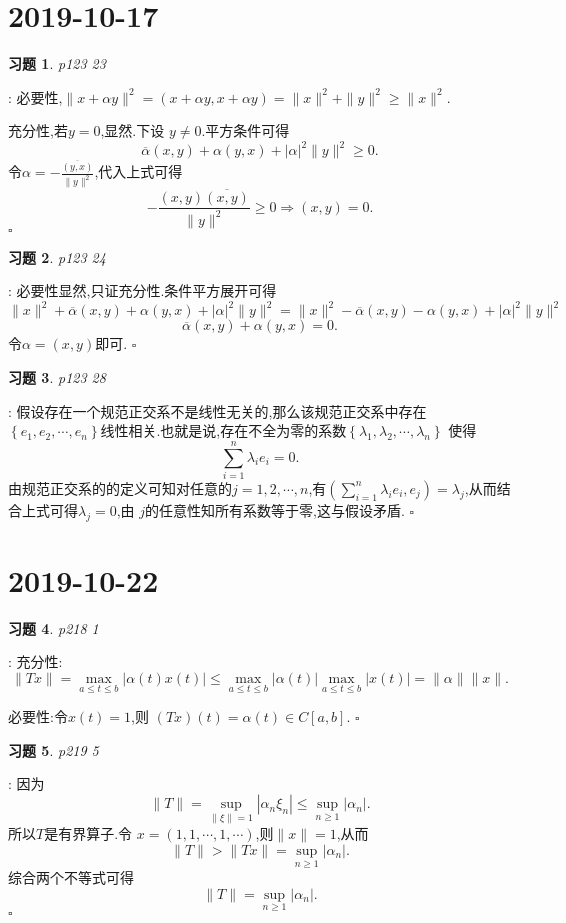\documentclass[a4paper]{article}
\newtheorem*{exe}{习题}
\newenvironment{sol}{{\noindent\bfseries 解}:}{\hfill $\square$\par}
\begin{document}
\section{2019-10-17}
\begin{exe}
  p123 23
\end{exe}
\begin{sol}
  必要性,$\|x+\alpha y\|^2=(x+\alpha y,x+\alpha y)=\|x\|^2+\|y\|^2\ge \|x\|^2$.
  
  充分性,若$y=0$,显然.下设 $y\neq 0$.平方条件可得
   \[
     \overline{\alpha}(x,y)+\alpha(y,x)+\left| \alpha \right| ^2\|y\|^2\ge 0
   .\] 
   令$\alpha=-\frac{\overline{(y,x)}}{\|y\|^2}$,代入上式可得
   \[
     -\frac{(x,y)\overline{(x,y)}}{\|y\|^2}\ge 0\Rightarrow (x,y)=0
   .\] 
\end{sol}
\begin{exe}
  p123 24
\end{exe}
\begin{sol}
  必要性显然,只证充分性.条件平方展开可得
  \[
    \|x\|^2+\overline{\alpha}(x,y)+\alpha(y,x)+\left| \alpha \right| ^2\|y\|^2=\|x\|^2-\overline{\alpha}(x,y)-\alpha(y,x)+\left| \alpha \right| ^2\|y\|^2
  \] 
  \[
    \overline{\alpha}(x,y)+\alpha(y,x)=0
  .\] 
  令$\alpha=(x,y)$即可.
\end{sol}
\begin{exe}
  p123 28
\end{exe}
\begin{sol}
  假设存在一个规范正交系不是线性无关的,那么该规范正交系中存在$\left\{ e_1,e_2,\cdots,e_n \right\} $线性相关.也就是说,存在不全为零的系数$\left\{ \lambda_1,\lambda_2,\cdots,\lambda_n \right\} $ 使得
  \[
  \sum_{i=1}^{n} \lambda_ie_i=0
  .\] 
  由规范正交系的的定义可知对任意的$j=1,2,\cdots,n$,有$(\sum_{i=1}^{n} \lambda_ie_i,e_j)=\lambda_j$,从而结合上式可得$\lambda_j=0$,由 $j$的任意性知所有系数等于零,这与假设矛盾.
\end{sol}
\section{2019-10-22}
\begin{exe}
  p218 1
\end{exe}
\begin{sol}
  充分性:
  \[
    \|Tx\|=\max_{a\le t\le b}\left| \alpha(t)x(t) \right| \le \max_{a\le t\le b}\left| \alpha(t) \right| \max_{a\le t\le b}\left| x(t) \right| = \|\alpha\|\|x\|
  .\]

  必要性:令$x(t)=1$,则 $(Tx)(t)=\alpha(t)\in C[a,b]$.
\end{sol}
\begin{exe}
  p219 5
\end{exe}
\begin{sol}
  因为
  \[
  \|T\|=\sup_{\|\xi\|=1}\left| \alpha_n\xi_n \right| \le \sup_{n\ge 1}\left| \alpha_n \right| 
  .\] 
  所以$T$是有界算子.令 $x=\left( 1,1,\cdots,1,\cdots \right) $,则$\|x\|=1$,从而
  \[
  \|T\|>\|Tx\|=\sup_{n\ge 1}\left| \alpha_n \right| 
  .\] 
  综合两个不等式可得
  \[
  \|T\|=\sup_{n\ge 1}\left| \alpha_n \right| 
  .\] 
\end{sol}
\end{document}
